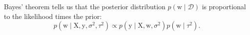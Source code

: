 \documentclass{article}
\newcommand{\given}{\mid}
\newcommand{\mc}[1]{\mathcal{#1}}
\newcommand{\data}{\mc{D}}
\newcommand{\trans}{^\top}
\newcommand{\mat}[1]{\bm{\mathrm{#1}}}
\renewcommand{\vec}[1]{\bm{\mathrm{#1}}}
\renewcommand{\epsilon}{\varepsilon}
\begin{document}
Bayes' theorem tells us that the posterior distribution $p(\vec{w}
\given \data)$ is proportional to the likelihood times the prior:
\begin{equation*}
  p(\vec{w} \given \mat{X}, \vec{y}, \sigma^2, \tau^2)
  \propto
  p(\vec{y} \given \mat{X}, \vec{w}, \sigma^2)
  p(\vec{w} \given \tau^2).
\end{equation*}

\end{document}
